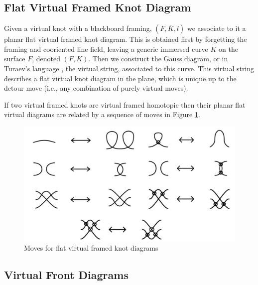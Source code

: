 \subsection{Flat Virtual Framed Knot Diagram}
Given a virtual knot with a blackboard framing, $(F, \bar{K}, l)$ we associate to it a planar flat virtual framed knot diagram.  This is obtained first by forgetting the framing and cooriented line field, leaving a generic immersed curve $K$ on the surface $F$, denoted $(F, K)$. Then we construct the Gauss diagram, or in Turaev's language \cite{Turaev}, the virtual string, associated to this curve.  This virtual string describes a flat virtual knot diagram in the plane, which is unique up to the detour move (i.e., any combination of purely virtual moves).


If two virtual framed knots are virtual framed homotopic then their planar flat virtual diagrams are related by a sequence of moves in Figure \ref{flatDiagramMoves.fig}.

\begin{figure}[htbp]
	\includegraphics[width=12cm]{flatDiagramMoves}
	\caption{Moves for flat virtual framed knot diagrams}
	\label{flatDiagramMoves.fig}
\end{figure}

\subsection{Virtual Front Diagrams}
